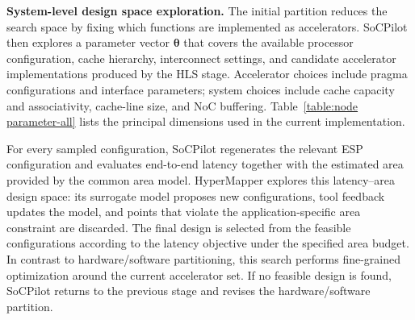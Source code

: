 \textbf{System-level design space exploration.}
The initial partition reduces the search space by fixing which functions are implemented as accelerators. SoCPilot then explores a parameter vector $\boldsymbol{\theta}$ that covers the available processor configuration, cache hierarchy, interconnect settings, and candidate accelerator implementations produced by the HLS stage. Accelerator choices include pragma configurations and interface parameters; system choices include cache capacity and associativity, cache-line size, and NoC buffering. Table~\ref{table:node parameter-all} lists the principal dimensions used in the current implementation.
\begin{table}[h]
     \vspace{-1em}
    \caption{Principal parameters for system-level DSE}
    \label{table:node parameter-all}
    \vspace{-0.5em}
\end{table}

For every sampled configuration, SoCPilot regenerates the relevant ESP configuration and evaluates end-to-end latency together with the estimated area provided by the common area model. HyperMapper \cite{9124618} explores this latency--area design space: its surrogate model proposes new configurations, tool feedback updates the model, and points that violate the application-specific area constraint are discarded. The final design is selected from the feasible configurations according to the latency objective under the specified area budget. In contrast to hardware/software partitioning, this search performs fine-grained optimization around the current accelerator set. If no feasible design is found, SoCPilot returns to the previous stage and revises the hardware/software partition.

